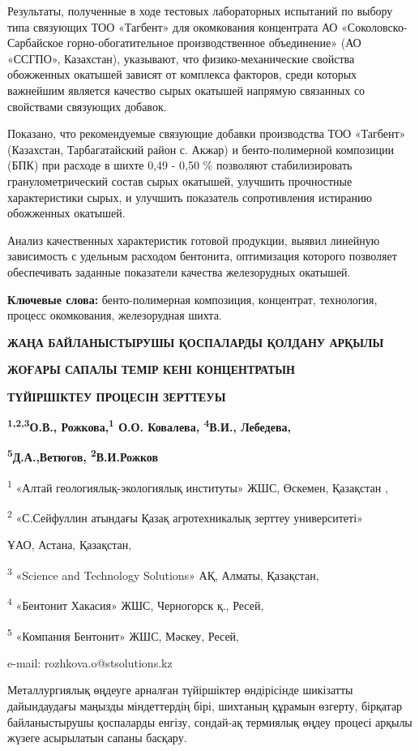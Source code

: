 Результаты, полученные в ходе тестовых лабораторных испытаний по выбору
типа связующих ТОО «Тагбент» для окомкования концентрата АО
«Соколовско-Сарбайское горно-обогатительное производственное
объединение» (АО «ССГПО», Казахстан), указывают, что физико-механические
свойства обожженных окатышей зависят от комплекса факторов, среди
которых важнейшим является качество сырых окатышей напрямую связанных со
свойствами связующих добавок.

Показано, что рекомендуемые связующие добавки производства ТОО «Тагбент»
(Казахстан, Тарбагатайский район с. Акжар) и бенто-полимерной композиции
(БПК) при расходе в шихте 0,49 - 0,50 \% позволяют стабилизировать
гранулометрический состав сырых окатышей, улучшить прочностные
характеристики сырых, и улучшить показатель сопротивления истиранию
обожженных окатышей.

Анализ качественных характеристик готовой продукции, выявил линейную
зависимость с удельным расходом бентонита, оптимизация которого
позволяет обеспечивать заданные показатели качества железорудных
окатышей.

{\bfseries Ключевые слова:} бенто-полимерная композиция, концентрат,
технология, процесс окомкования, железорудная шихта.

{\bfseries ЖАҢА БАЙЛАНЫСТЫРУШЫ ҚОСПАЛАРДЫ ҚОЛДАНУ АРҚЫЛЫ}

{\bfseries ЖОҒАРЫ САПАЛЫ ТЕМІР КЕНІ КОНЦЕНТРАТЫН}

{\bfseries ТҮЙІРШІКТЕУ ПРОЦЕСІН ЗЕРТТЕУЫ}

{\bfseries \textsuperscript{1,2,3}О.В.,
Рожкова\textsuperscript{\envelope },\textsuperscript{1} О.О. Ковалева,
\textsuperscript{4}В.И., Лебедева,}

{\bfseries \textsuperscript{5}Д.А.,Ветюгов, \textsuperscript{2}В.И.Рожков}

\textsuperscript{1} «Алтай геологиялық-экологиялық институты» ЖШС,
Өскемен, Қазақстан ,

\textsuperscript{2} «С.Сейфуллин атындағы Қазақ агротехникалық зерттеу
университеті»

ҰАО, Астана, Қазақстан,

\textsuperscript{3} «Science and Technology Solutions» АҚ, Алматы,
Қазақстан,

\textsuperscript{4} «Бентонит Хакасия» ЖШС, Черногорск қ., Ресей,

\textsuperscript{5} «Компания Бентонит» ЖШС, Мәскеу, Ресей,

e-mail: rozhkova.o@stsolutions.kz

Металлургиялық өңдеуге арналған түйіршіктер өндірісінде шикізатты
дайындаудағы маңызды міндеттердің бірі, шихтаның құрамын өзгерту,
бірқатар байланыстырушы қоспаларды енгізу, сондай-ақ термиялық өңдеу
процесі арқылы жүзеге асырылатын сапаны басқару.

